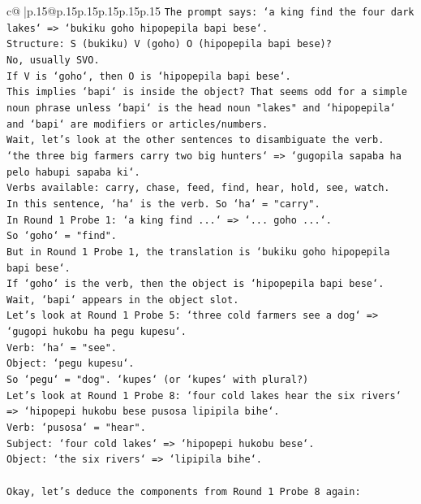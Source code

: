 \documentclass{article}
\begin{document}
{\begin{supertabular}{c@{$\;$}|p{.15\linewidth}@{}p{.15\linewidth}p{.15\linewidth}p{.15\linewidth}p{.15\linewidth}p{.15\linewidth}}
{{{\texttt{The prompt says: `a king find the four dark lakes` => `bukiku goho hipopepila bapi bese`.} \\
\texttt{Structure: S (bukiku) V (goho) O (hipopepila bapi bese)?} \\
\texttt{No, usually SVO.} \\
\texttt{If V is `goho`, then O is `hipopepila bapi bese`.} \\
\texttt{This implies `bapi` is inside the object? That seems odd for a simple noun phrase unless `bapi` is the head noun "lakes" and `hipopepila` and `bapi` are modifiers or articles/numbers.} \\
\texttt{Wait, let's look at the other sentences to disambiguate the verb.} \\
\texttt{`the three big farmers carry two big hunters` => `gugopila sapaba ha pelo habupi sapaba ki`.} \\
\texttt{Verbs available: carry, chase, feed, find, hear, hold, see, watch.} \\
\texttt{In this sentence, `ha` is the verb. So `ha` = "carry".} \\
\texttt{In Round 1 Probe 1: `a king find ...` => `... goho ...`.} \\
\texttt{So `goho` = "find".} \\
\texttt{But in Round 1 Probe 1, the translation is `bukiku goho hipopepila bapi bese`.} \\
\texttt{If `goho` is the verb, then the object is `hipopepila bapi bese`.} \\
\texttt{Wait, `bapi` appears in the object slot.} \\
\texttt{Let's look at Round 1 Probe 5: `three cold farmers see a dog` => `gugopi hukobu ha pegu kupesu`.} \\
\texttt{Verb: `ha` = "see".} \\
\texttt{Object: `pegu kupesu`.} \\
\texttt{So `pegu` = "dog". `kupes` (or `kupes` with plural?)} \\
\texttt{Let's look at Round 1 Probe 8: `four cold lakes hear the six rivers` => `hipopepi hukobu bese pusosa lipipila bihe`.} \\
\texttt{Verb: `pusosa` = "hear".} \\
\texttt{Subject: `four cold lakes` => `hipopepi hukobu bese`.} \\
\texttt{Object: `the six rivers` => `lipipila bihe`.} \\
\\ 
\texttt{Okay, let's deduce the components from Round 1 Probe 8 again:} \\
}}}
\end{supertabular}}
\end{document}
